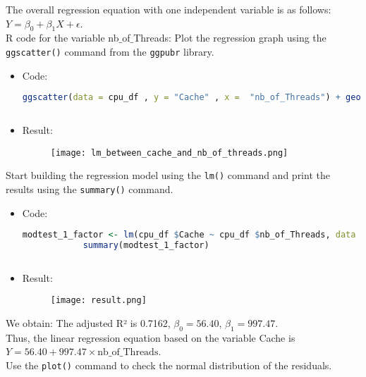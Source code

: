 \documentclass{article}
\begin{document}
	The overall regression equation with one independent variable is as follows: $Y = \beta_0 + \beta_1 X + \epsilon$.\\
	R code for the variable nb$\_$of$\_$Threads:
	Plot the regression graph using the \texttt{ggscatter()} command from the \texttt{ggpubr} library.
	\newpage
	\begin{itemize}
		\item Code:
		\begin{lstlisting}[language=R]
			ggscatter(data = cpu_df , y = "Cache" , x =  "nb_of_Threads") + geom_smooth(method = "lm" , se = TRUE)
			
		\end{lstlisting}
		\item Result:
		\begin{figure}[h]
			\centering
			\texttt{[image: lm\_between\_cache\_and\_nb\_of\_threads.png]} %
			\label{fig:enter-label}
		\end{figure}
		
	\end{itemize}
	Start building the regression model using the \texttt{lm()} command and print the results using the \texttt{summary()} command.
	\begin{itemize}
		\item Code:
		
		\begin{lstlisting}[language=R]
			modtest_1_factor <- lm(cpu_df $Cache ~ cpu_df $nb_of_Threads, data = cpu_df)
			summary(modtest_1_factor)
			
		\end{lstlisting}
		\item Result:
		\begin{figure}[h]
			\centering
			\texttt{[image: result.png]}
			\label{fig:enter-label}
		\end{figure}
		
	\end{itemize}
	We obtain: The adjusted R² is 0.7162, $\beta_0 = 56.40$, $\beta_1 = 997.47$. 
	\\
	Thus, the linear regression equation based on the variable Cache is $Y = 56.40 + 997.47 \times \text{nb$\_$of$\_$Threads}$. 
	\\
	Use the \texttt{plot()} command to check the normal distribution of the residuals.
\end{document}
